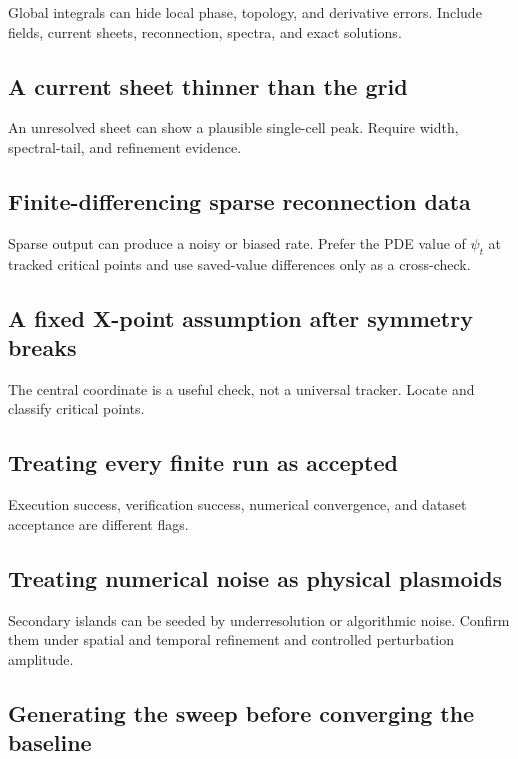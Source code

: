 \documentclass[11pt]{article}
\begin{document}
Global integrals can hide local phase, topology, and derivative errors. Include fields, current sheets, reconnection, spectra, and exact solutions.

\subsection{A current sheet thinner than the grid}

An unresolved sheet can show a plausible single-cell peak. Require width, spectral-tail, and refinement evidence.

\subsection{Finite-differencing sparse reconnection data}

Sparse output can produce a noisy or biased rate. Prefer the PDE value of $\psi_t$ at tracked critical points and use saved-value differences only as a cross-check.

\subsection{A fixed X-point assumption after symmetry breaks}

The central coordinate is a useful check, not a universal tracker. Locate and classify critical points.

\subsection{Treating every finite run as accepted}

Execution success, verification success, numerical convergence, and dataset acceptance are different flags.

\subsection{Treating numerical noise as physical plasmoids}

Secondary islands can be seeded by underresolution or algorithmic noise. Confirm them under spatial and temporal refinement and controlled perturbation amplitude.

\subsection{Generating the sweep before converging the baseline}
\end{document}
